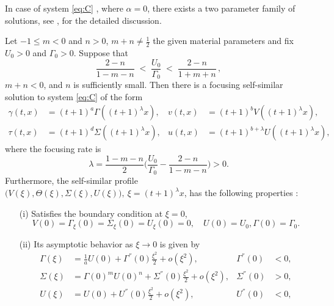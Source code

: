 \documentclass[graybox]{svmult}
\begin{document}
In case of system \eqref{eq:C} , where  $\alpha=0$,  there exists a two parameter family of solutions,  see \cite{KLT_2016}, \cite{LT16} for the detailed discussion. 
\begin{theorem} \label{thm2}
Let $-1\le m<0$ and $n>0$, $m+n\ne \frac{1}{2}$ the given material parameters and fix $U_0>0$ and $\Gamma_0>0$. Suppose that
\begin{equation*}
 \frac{2-n}{1-m-n} \;<\; \frac{U_0}{\Gamma_0} \;<\; \frac{2-n}{1+m+n} \, ,
\end{equation*}
$m+n<0$, and $n$ is sufficiently small. Then there is a focusing self-similar solution to system \eqref{eq:C} of the form
\begin{equation*}
\begin{aligned}
 \gamma(t,x) &= (t+1)^a\Gamma((t+1)^\lambda x), & v(t,x) &= (t+1)^b V((t+1)^\lambda x), \\
 \tau(t,x) &= (t+1)^d \Sigma((t+1)^\lambda x), & u(t,x) &= (t+1)^{b+\lambda} U((t+1)^\lambda x),
\end{aligned}
\end{equation*}
where the focusing rate is
\begin{equation}
 \lambda = \frac{1-m-n}{2}\Big(\frac{U_0}{\Gamma_0} - \frac{2-n}{1-m-n}\Big)>0. \label{eq:lambdaC}
\end{equation}
Furthermore, the self-similar profile $\big(V(\xi),\Theta(\xi),\Sigma(\xi),U(\xi)\big), \ \xi = (t+1)^\lambda x$,  has the  following properties :
 \begin{enumerate}
  \item[(i)] Satisfies the boundary condition at $\xi=0$,
    \begin{equation*}
    {V}(0) = \Gamma_\xi(0) = \Sigma_\xi(0) = {U}_\xi(0)=0, \quad U(0)=U_0, \Gamma(0)=\Gamma_0.
  \end{equation*}
  \item[(ii)] Its asymptotic behavior as $\xi \rightarrow 0$ is given by 
  \begin{equation} \label{eq:ss_asympC0}
  \begin{aligned}
    \Gamma(\xi) &= \frac{1}{a}U(0) + \Gamma^{''}(0)\frac{\xi^2}{2} + o(\xi^2), & \Gamma^{''}(0)&<0,\\
    \Sigma(\xi) &= \Gamma(0)^{m}{U(0)^n}+ \Sigma^{''}(0)\frac{\xi^2}{2} + o(\xi^2), & \Sigma^{''}(0)&>0, \\
    U(\xi) &= U(0) + U^{''}(0)\frac{\xi^2}{2} + o(\xi^2), & U^{''}(0)&<0,\\

\end{aligned}
\end{equation}
\end{enumerate}
\end{theorem}
\end{document}
